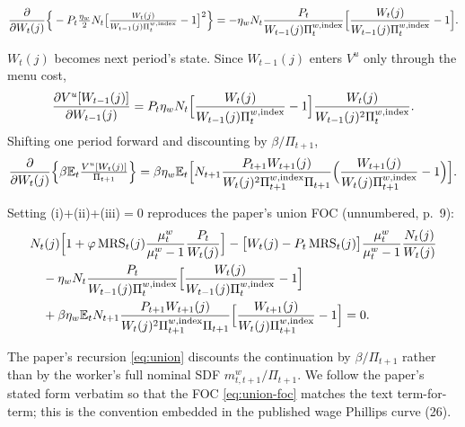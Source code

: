 \[
\frac{\partial }{\partial W_t(j)}\Big\{-P_t\tfrac{\eta_w}{2}N_t\big[\tfrac{W_t(j)}{W_{t-1}(j)\Pi^{w,\text{index}}_t}-1\big]^2\Big\}
=-\eta_wN_t\frac{P_t}{W_{t-1}(j)\Pi^{w,\text{index}}_t}\Big[\frac{W_t(j)}{W_{t-1}(j)\Pi^{w,\text{index}}_t}-1\Big].
\]

$W_t(j)$ becomes next period's state. Since $W_{t-1}(j)$ enters $V^u$ only through the menu cost,
\[
\frac{\partial V^u[W_{t-1}(j)]}{\partial W_{t-1}(j)}
=P_t\eta_wN_t\Big[\frac{W_t(j)}{W_{t-1}(j)\Pi^{w,\text{index}}_t}-1\Big]\frac{W_t(j)}{W_{t-1}(j)^2\Pi^{w,\text{index}}_t} .
\]
Shifting one period forward and discounting by $\beta/\Pi_{t+1}$,
\[
\frac{\partial }{\partial W_t(j)}\Big\{\beta\mathbb{E}_t\tfrac{V^u[W_t(j)]}{\Pi_{t+1}}\Big\}
=\beta\eta_w\mathbb{E}_t\Big[N_{t+1}\frac{P_{t+1}W_{t+1}(j)}{W_t(j)^2\Pi^{w,\text{index}}_{t+1}\Pi_{t+1}}
\Big(\frac{W_{t+1}(j)}{W_t(j)\Pi^{w,\text{index}}_{t+1}}-1\Big)\Big].
\]

Setting (i)+(ii)+(iii)$=0$ reproduces the paper's union FOC (unnumbered, p.\ 9):
\begin{align}
&N_t(j)\Big[1+\varphi\operatorname{MRS}_t(j)\frac{\mu^w_t}{\mu^w_t-1}\frac{P_t}{W_t(j)}\Big]
-\big[W_t(j)-P_t\operatorname{MRS}_t(j)\big]\frac{\mu^w_t}{\mu^w_t-1}\frac{N_t(j)}{W_t(j)}\nonumber\\
&\quad-\eta_wN_t\frac{P_t}{W_{t-1}(j)\Pi^{w,\text{index}}_t}\Big[\frac{W_t(j)}{W_{t-1}(j)\Pi^{w,\text{index}}_t}-1\Big]\nonumber\\
&\quad+\beta\eta_w\mathbb{E}_tN_{t+1}\frac{P_{t+1}W_{t+1}(j)}{W_t(j)^2\Pi^{w,\text{index}}_{t+1}\Pi_{t+1}}
\Big[\frac{W_{t+1}(j)}{W_t(j)\Pi^{w,\text{index}}_{t+1}}-1\Big]=0.\label{eq:union-foc}
\end{align}

\begin{remark}
The paper's recursion \eqref{eq:union} discounts the continuation by $\beta/\Pi_{t+1}$ rather than by
the worker's full nominal SDF $m^w_{t,t+1}/\Pi_{t+1}$. We follow the paper's stated form verbatim so
that the FOC \eqref{eq:union-foc} matches the text term-for-term; this is the convention embedded in
the published wage Phillips curve (26).
\end{remark}

